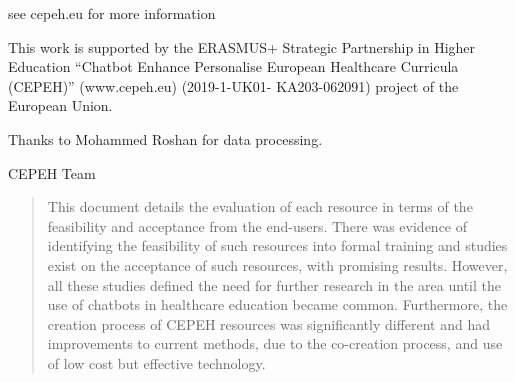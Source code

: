 \documentclass[a4paper, nobind]{templates/ociamthesis}
\begin{document}

\begin{romanpages}

\maketitle

\begin{dedication}
  see cepeh.eu for more information
\end{dedication}



\begin{acknowledgements}
 	This work is supported by the ERASMUS+ Strategic Partnership in Higher Education ``Chatbot Enhance Personalise European Healthcare Curricula (CEPEH)'' (www.cepeh.eu) (2019-1-UK01- KA203-062091) project of the European Union.

 Thanks to Mohammed Roshan for data processing.

 \begin{flushright}
 CEPEH Team \\
 \end{flushright}
\end{acknowledgements}





\renewcommand{\abstracttitle}{Abstract}
\begin{abstract}
	This document details the evaluation of each resource in terms of the feasibility and acceptance from the end-users. There was evidence of identifying the feasibility of such resources into formal training and studies exist on the acceptance of such resources, with promising results. However, all these studies defined the need for further research in the area until the use of chatbots in healthcare education became common. Furthermore, the creation process of CEPEH resources was significantly different and had improvements to current methods, due to the co-creation process, and use of low cost but effective technology.
\end{abstract}




\end{romanpages}
\end{document}
